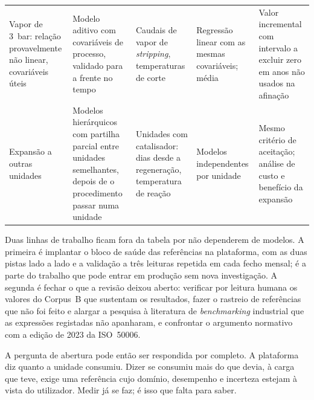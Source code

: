 \begin{table}[htbp]
\begin{tabularx}{\textwidth}{@{}>{\raggedright\arraybackslash}p{2.6cm}>{\raggedright\arraybackslash}X>{\raggedright\arraybackslash}p{2.6cm}>{\raggedright\arraybackslash}p{2.4cm}>{\raggedright\arraybackslash}X@{}}
    \addlinespace
    Vapor de 3~bar: relação provavelmente não linear, covariáveis úteis & Modelo aditivo com covariáveis de processo, validado para a frente no tempo & Caudais de vapor de \emph{stripping}, temperaturas de corte & Regressão linear com as mesmas covariáveis; média & Valor incremental com intervalo a excluir zero em anos não usados na afinação \\
    \addlinespace
    Expansão a outras unidades & Modelos hierárquicos com partilha parcial entre unidades semelhantes, depois de o procedimento passar numa unidade & Unidades com catalisador: dias desde a regeneração, temperatura de reação & Modelos independentes por unidade & Mesmo critério de aceitação; análise de custo e benefício da expansão \\
    \bottomrule
  \end{tabularx}
\end{table}

Duas linhas de trabalho ficam fora da tabela por não dependerem de modelos.
A primeira é implantar o bloco de saúde das referências na plataforma, com
as duas pistas lado a lado e a validação a três leituras repetida em cada
fecho mensal; é a parte do trabalho que pode entrar em produção sem nova
investigação. A segunda é fechar o que a revisão deixou aberto: verificar por
leitura humana os valores do Corpus~B que sustentam os resultados, fazer o
rastreio de referências que não foi feito e alargar a pesquisa à literatura
de \emph{benchmarking} industrial que as expressões registadas não
apanharam, e confrontar o argumento normativo com a edição de 2023 da
ISO~50006.

A pergunta de abertura pode então ser respondida por completo. A plataforma
diz quanto a unidade consumiu. Dizer se consumiu mais do que devia, à carga
que teve, exige uma referência cujo domínio, desempenho e incerteza estejam
à vista do utilizador. Medir já se faz; é isso que falta para saber.
